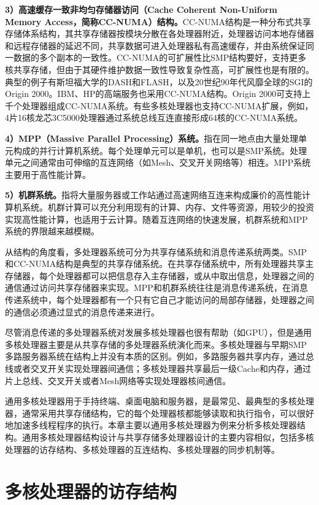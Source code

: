\documentclass[]{ctexbook}
\begin{document}
\textbf{3）高速缓存一致非均匀存储器访问（Cache Coherent Non-Uniform Memory Access，简称CC-NUMA）结构。}CC-NUMA结构是一种分布式共享存储体系结构，其共享存储器按模块分散在各处理器附近，处理器访问本地存储器和远程存储器的延迟不同，共享数据可进入处理器私有高速缓存，并由系统保证同一数据的多个副本的一致性。CC-NUMA的可扩展性比SMP结构要好，支持更多核共享存储，但由于其硬件维护数据一致性导致复杂性高，可扩展性也是有限的。典型的例子有斯坦福大学的DASH和FLASH，以及20世纪90年代风靡全球的SGI的Origin 2000。IBM、HP的高端服务也采用CC-NUMA结构。Origin 2000可支持上千个处理器组成CC-NUMA系统。有些多核处理器也支持CC-NUMA扩展，例如，4片16核龙芯3C5000处理器通过系统总线互连直接形成64核的CC-NUMA系统。

\textbf{4）MPP（Massive Parallel Processing）系统。}指在同一地点由大量处理单元构成的并行计算机系统。每个处理单元可以是单机，也可以是SMP系统。处理单元之间通常由可伸缩的互连网络（如Mesh、交叉开关网络等）相连。MPP系统主要用于高性能计算。

\textbf{5）机群系统。}指将大量服务器或工作站通过高速网络互连来构成廉价的高性能计算机系统。机群计算可以充分利用现有的计算、内存、文件等资源，用较少的投资实现高性能计算，也适用于云计算。随着互连网络的快速发展，机群系统和MPP系统的界限越来越模糊。

从结构的角度看，多处理器系统可分为共享存储系统和消息传递系统两类。SMP和CC-NUMA结构是典型的共享存储系统。在共享存储系统中，所有处理器共享主存储器，每个处理器都可以把信息存入主存储器，或从中取出信息，处理器之间的通信通过访问共享存储器来实现。MPP和机群系统往往是消息传递系统，在消息传递系统中，每个处理器都有一个只有它自己才能访问的局部存储器，处理器之间的通信必须通过显式的消息传递来进行。

尽管消息传递的多处理器系统对发展多核处理器也很有帮助（如GPU），但是通用多核处理器主要是从共享存储的多处理器系统演化而来。多核处理器与早期SMP多路服务器系统在结构上并没有本质的区别。例如，多路服务器共享内存，通过总线或者交叉开关实现处理器间通信；多核处理器共享最后一级Cache和内存，通过片上总线、交叉开关或者Mesh网络等实现处理器核间通信。

通用多核处理器用于手持终端、桌面电脑和服务器，是最常见、最典型的多核处理器，通常采用共享存储结构，它的每个处理器核都能够读取和执行指令，可以很好地加速多线程程序的执行。本章主要以通用多核处理器为例来分析多核处理器结构。通用多核处理器结构设计与共享存储多处理器设计的主要内容相似，包括多核处理器的访存结构、多核处理器的互连结构、多核处理器的同步机制等。

\hypertarget{ux591aux6838ux5904ux7406ux5668ux7684ux8bbfux5b58ux7ed3ux6784}{%
\section{多核处理器的访存结构}\label{ux591aux6838ux5904ux7406ux5668ux7684ux8bbfux5b58ux7ed3ux6784}}
\end{document}
